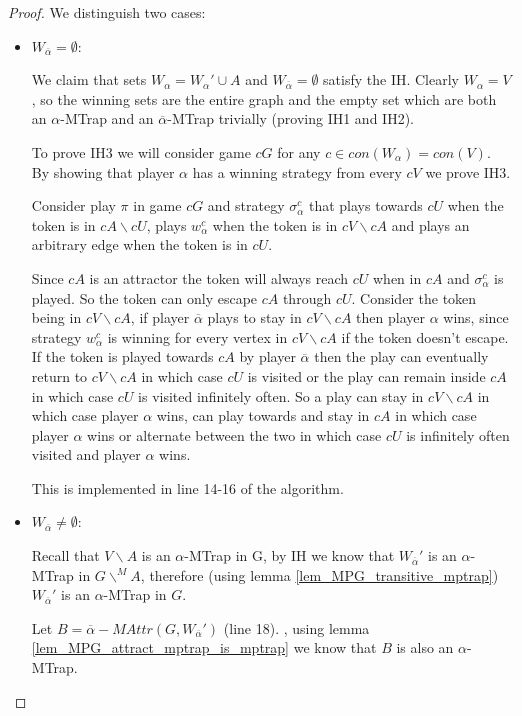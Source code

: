 \begin{theorem}
\begin{proof}
		 We distinguish two cases:
		\begin{itemize}
			\item $W_{\overline{\alpha}} = \emptyset$:
			
			We claim that sets $W_\alpha = W_\alpha' \cup A$ and $W_{\overline{\alpha}} = \emptyset$ satisfy the IH. Clearly $W_\alpha = V$, so the winning sets are the entire graph and the empty set which are both an $\alpha$-MTrap and an $\overline{\alpha}$-MTrap trivially (proving IH1 and IH2).
			
			To prove IH3 we will consider game $cG$ for any $c \in con(W_\alpha) = con(V)$. By showing that player $\alpha$ has a winning strategy from every $cV$ we prove IH3.
			
			Consider play $\pi$ in game $cG$ and strategy $\sigma_\alpha^c$ that plays towards $cU$ when the token is in $cA \backslash cU$, plays $w^c_\alpha$ when the token is in $cV \backslash cA$ and plays an arbitrary edge when the token is in $cU$.
			
			Since $cA$ is an attractor the token will always reach $cU$ when in $cA$ and $\sigma_\alpha^c$ is played. So the token can only escape $cA$ through $cU$. Consider the token being in $cV\backslash cA$, if player $\overline{\alpha}$ plays to stay in $cV \backslash cA$ then player $\alpha$ wins, since strategy $w_\alpha^c$ is winning for every vertex in $cV \backslash cA$ if the token doesn't escape. If the token is played towards $cA$ by player $\overline{\alpha}$ then the play can eventually return to $cV \backslash cA$ in which case $cU$ is visited or the play can remain inside $cA$ in which case $cU$ is visited infinitely often. So a play can stay in $cV\backslash cA$ in which case player $\alpha$ wins, can play towards and stay in $cA$ in which case player $\alpha$ wins or alternate between the two in which case $cU$ is infinitely often visited and player $\alpha$ wins.
			
			This is implemented in line 14-16 of the algorithm.
			
			\item $W_{\overline{\alpha}} \neq \emptyset$:
			
			Recall that $V \backslash A$ is an $\alpha$-MTrap in G, by IH we know that $W_{\overline{\alpha}}'$ is an $\alpha$-MTrap in $G\backslash^{\!\!M} A$, therefore (using lemma \ref{lem_MPG_transitive_mptrap}) $W_{\overline{\alpha}}'$ is an $\alpha$-MTrap in $G$.
			
			Let $B = \overline{\alpha}{-}MAttr(G, W_{\overline{\alpha}}')$ (line 18). , using lemma \ref{lem_MPG_attract_mptrap_is_mptrap} we know that $B$ is also an $\alpha$-MTrap.
			

\end{itemize}
\end{proof}
\end{theorem}
